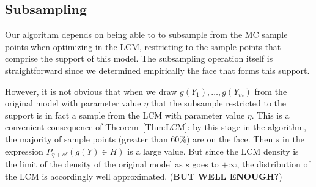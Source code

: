 \subsection{Subsampling}
Our algorithm depends on being able to to subsample from the MC sample points when 
optimizing in the LCM, restricting to the sample points that comprise the support of 
this model.  The subsampling operation itself is straightforward since we determined 
empirically the face that forms this support.  

However, it is not obvious that when we draw $g(Y_1), \ldots, g(Y_m)$ from the 
original model with parameter value $\eta$ that the subsample restricted to the 
support is in fact a sample from the LCM with parameter value $\eta$.  This is a 
convenient consequence of Theorem~\ref{Thm:LCM}: by this stage in the algorithm, the 
majority of sample points (greater than 60\%) are on the face.  Then $s$ in the 
expression $P_{\eta + s \delta}(g(Y) \in H)$ is a large value.  But since the LCM 
density is the limit of the density of the original model as $s$ goes to $+\infty$, 
the distribution of the LCM is accordingly well approximated.  (\textbf{BUT WELL 
ENOUGH?})
